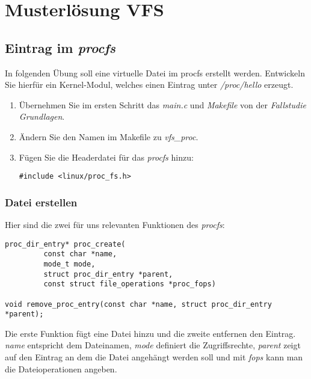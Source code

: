 \section{Musterlösung VFS}

\subsection{Eintrag im \emph{procfs}}

In folgenden Übung soll eine virtuelle Datei im procfs erstellt werden. Entwickeln Sie hierfür ein Kernel-Modul,
welches einen Eintrag unter \emph{/proc/hello} erzeugt. \\

\begin{enumerate}
   \item Übernehmen Sie im ersten Schritt das \emph{main.c} und \emph{Makefile} von der \emph{Fallstudie Grundlagen}. 
   \item Ändern Sie den Namen im Makefile zu \emph{vfs\_proc}. 
   \item Fügen Sie die Headerdatei für das \emph{procfs} hinzu:
\begin{lstlisting}
#include <linux/proc_fs.h>
\end{lstlisting}
\end{enumerate}

\subsubsection{Datei erstellen}

Hier sind die zwei für uns relevanten Funktionen des \emph{procfs}:
\begin{lstlisting}
proc_dir_entry* proc_create(
         const char *name, 
         mode_t mode, 
         struct proc_dir_entry *parent, 
         const struct file_operations *proc_fops)

void remove_proc_entry(const char *name, struct proc_dir_entry *parent);
\end{lstlisting}

Die erste Funktion fügt eine Datei hinzu und die zweite entfernen den Eintrag. \emph{name} entspricht dem Dateinamen,
\emph{mode} definiert die Zugriffsrechte, \emph{parent} zeigt auf den Eintrag an dem die Datei angehängt werden soll
und mit \emph{fops} kann man die Dateioperationen angeben. \\

